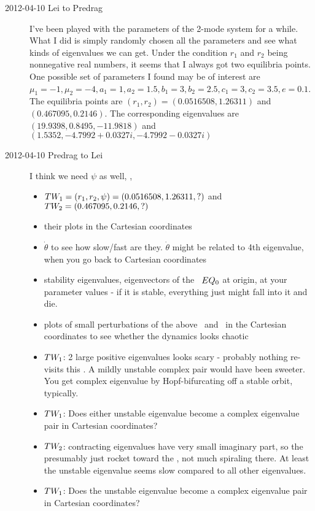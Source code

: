 \begin{description}
\item[2012-04-10 Lei to Predrag] I've been played with the parameters of
the 2-mode system for a while. What I did is simply randomly chosen all
the parameters and see what kinds of eigenvalues we can get. Under the
condition $r_1$ and $r_2$ being nonnegative real numbers, it seems that I
always got two equilibria points. One possible set of parameters I found
may be of interest are
$\mu_1=-1,\mu_2=-4,a_1=1,a_2=1.5,b_1=3,b_2=2.5,c_1=3,c_2=3.5,e=0.1$. The
equilibria points are $(r_1,r_2)=(0.0516508, 1.26311)$ and
$(0.467095,0.2146)$. The corresponding eigenvalues are
$(19.9398,0.8495,-11.9818)$ and $(1.5352,-4.7992+0.0327i,
-4.7992-0.0327i)$

\item[2012-04-10 Predrag to Lei] I think we need $\psi$ as well, \ie,
\begin{itemize}
  \item $TW_{1} = (r_1,r_2,\psi)=(0.0516508, 1.26311,?)$ and
        $TW_{2} = (0.467095,0.2146,?)$
  \item their plots in the Cartesian coordinates
  \item $\dot{\theta}$ to see how slow/fast are they. $\dot{\theta}$
        might be related to 4th eigenvalue, when you go back
        to Cartesian coordinates
  \item stability eigenvalues, eigenvectors of the \eqv\ $EQ_{0}$ at
        origin, at your parameter values - if it is stable, everything
        just might fall into it and die.
  \item plots of small perturbations of the above \eqv\ and \reqva\ in
        the Cartesian coordinates to see whether the dynamics looks
        chaotic
  \item $TW_{1}$: 2 large positive eigenvalues looks scary - probably
        nothing re-visits this \reqv. A mildly unstable complex pair
        would have been sweeter. You get complex eigenvalue by Hopf-bifurcating off a
        stable orbit, typically.
  \item $TW_{1}$: Does either unstable eigenvalue become a complex
        eigenvalue pair in Cartesian coordinates?
  \item $TW_{2}$: contracting eigenvalues have very small imaginary
        part, so the presumably just rocket toward the \reqv, not much
        spiraling there. At least the unstable eigenvalue seems slow
        compared to all other eigenvalues.
  \item $TW_{1}$: Does the unstable eigenvalue become a complex
        eigenvalue pair in Cartesian coordinates?
\end{itemize}



\end{description}
